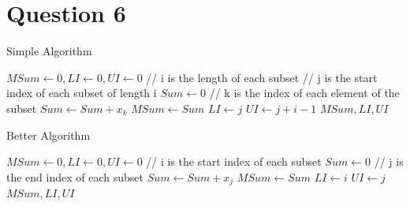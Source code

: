 \documentclass[11pt]{article}
\begin{document}
\section{Question 6}
\label{q6}
\begin{algorithm}
\caption{Simple Algorithm}
\begin{algorithmic}[1]
\State $MSum \gets 0, LI \gets 0, UI \gets 0$
 // i is the length of each subset
     // j is the start index of each subset of length i
        \State $Sum \gets 0$
         // k is the index of each element of the subset
            \State $Sum\gets Sum+x_k$
        \EndFor
            \State $MSum \gets Sum$
            \State $LI \gets j$
            \State $UI \gets j+i-1$
        \EndIf
    \EndFor
\EndFor
\State \Return $MSum, LI, UI$
\EndProcedure
\end{algorithmic}
\end{algorithm}
\newpage
\begin{algorithm}
\caption{Better Algorithm}
\begin{algorithmic}[1]
\State $MSum \gets 0, LI \gets 0, UI \gets 0$
 // i is the start index of each subset
    \State $Sum \gets 0$
     // j is the end index of each subset
        \State $Sum\gets Sum+x_j$
            \State $MSum \gets Sum$
            \State $LI \gets i$
            \State $UI \gets j$
        \EndIf
    \EndFor
\EndFor
\State \Return $MSum, LI, UI$
\EndProcedure
\end{algorithmic}
\end{algorithm}
\end{document}
